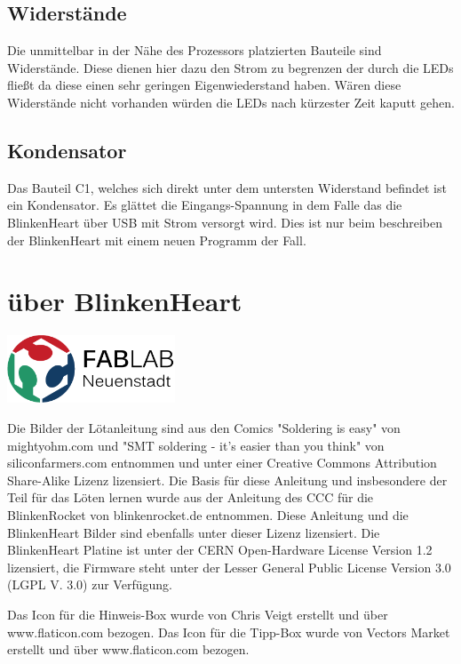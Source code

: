 \documentclass[a4paper,10pt]{article}
\begin{document}
\subsection{Widerstände}
Die unmittelbar in der Nähe des Prozessors platzierten Bauteile sind Widerstände. Diese dienen hier dazu den Strom zu begrenzen der durch die LEDs fließt da diese einen sehr geringen Eigenwiederstand haben. Wären diese Widerstände nicht vorhanden würden die LEDs nach kürzester Zeit kaputt gehen.

\subsection{Kondensator}
Das Bauteil C1, welches sich direkt unter dem untersten Widerstand befindet ist ein Kondensator. Es glättet die Eingangs-Spannung in dem Falle das die BlinkenHeart über USB mit Strom versorgt wird. Dies ist nur beim beschreiben der BlinkenHeart mit einem neuen Programm der Fall.

\newpage
\section{über BlinkenHeart}
\begin{center}
	\includegraphics[width=5cm]{logo}
\end{center}
Die Bilder der Lötanleitung sind aus den Comics "Soldering is easy" von mightyohm.com und
"SMT soldering - it's easier than you think" von siliconfarmers.com entnommen und unter einer
Creative Commons Attribution Share-Alike Lizenz lizensiert.
Die Basis für diese Anleitung
und insbesondere der Teil für das Löten lernen wurde aus der Anleitung des CCC für die BlinkenRocket
von blinkenrocket.de entnommen.
Diese Anleitung und die BlinkenHeart Bilder sind ebenfalls unter dieser Lizenz lizensiert.
Die BlinkenHeart Platine ist unter der CERN Open-Hardware License Version 1.2 lizensiert, die Firmware steht unter der Lesser General
Public License Version 3.0 (LGPL V. 3.0) zur Verfügung.

Das Icon für die Hinweis-Box wurde von Chris Veigt erstellt und über www.flaticon.com bezogen.
Das Icon für die Tipp-Box wurde von Vectors Market erstellt und über www.flaticon.com bezogen.
\end{document}

